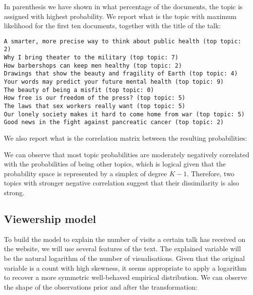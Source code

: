 \documentclass[a4paper, 11pt]{article} %
\begin{document}
In parenthesis we have shown in what percentage of the documents, the topic is assigned with highest probability. We report what is the topic with maximum likelihood for the first ten documents, together with the title of the talk:

\begin{verbatim}
A smarter, more precise way to think about public health (top topic: 2)
Why I bring theater to the military (top topic: 7)
How barbershops can keep men healthy (top topic: 2)
Drawings that show the beauty and fragility of Earth (top topic: 4)
Your words may predict your future mental health (top topic: 9)
The beauty of being a misfit (top topic: 0)
How free is our freedom of the press? (top topic: 5)
The laws that sex workers really want (top topic: 5)
Our lonely society makes it hard to come home from war (top topic: 5)
Good news in the fight against pancreatic cancer (top topic: 2)
\end{verbatim}

We also report what is the correlation matrix between the resulting probabilities:

\begin{center}

\end{center}

We can observe that most topic probabilities are moderately negatively correlated with the probabilities of being other topics, which is logical given that the probability space is represented by a simplex of degree $K-1$. Therefore, two topics with stronger negative correlation suggest that their dissimilarity is also strong.

\subsection*{Viewership model}

To build the model to explain the number of visits a certain talk has received on the website, we will use several features of the text. The explained variable will be the natural logarithm of the number of visualisations. Given that the original variable is a count with high skewness, it seems appropriate to apply a logarithm to recover a more symmetric well-behaved empirical distribution. We can observe the shape of the observations prior and after the transformation:

\begin{center}

\end{center}
\end{document}
